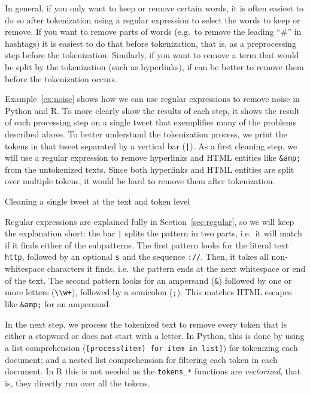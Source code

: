 In general, if you only want to keep or remove certain words, it is often easiest to do so after tokenization
using a regular expression to select the words to keep or remove.
If you want to remove parts of words (e.g.\ to remove the leading ``\#'' in hashtags) it is easiest to do that before tokenization,
that is, as a preprocessing step before the tokenization.
Similarly, if you want to remove a term that would be split by the tokenization (such as hyperlinks),
if can be better to remove them before the tokenization occurs.

Example~\ref{ex:noise} shows how we can use regular expressions to remove noise in Python and R.
To more clearly show the results of each step, it shows the result of each processing step on a single tweet that exemplifies many of the problems described above.
To better understand the tokenization process, we print the tokens in that tweet separated by a vertical bar (\verb+|+).
As a first cleaning step, we will use a regular expression to remove hyperlinks and HTML entities like \verb|&amp;| from the untokenized texts.
Since both hyperlinks and HTML entities are split over multiple tokens, it would be hard to remove them after tokenization.

\begin{ccsexample}
\caption{Cleaning a single tweet at the text and token level}\label{ex:noise}
\end{ccsexample}

Regular expressions are explained fully in Section~\ref{sec:regular}, so we will keep the explanation short:
the bar \verb#|# splits the pattern in two parts, i.e.\ it will match if it finds either of the subpatterns.
The first pattern looks for the literal text \verb#http#, followed by an optional \verb#s# and the sequence \verb#://#.
Then, it takes all non-whitespace characters it finds, i.e.\ the pattern ends at the next whitespace or end of the text.
The second pattern looks for an ampersand (\verb#&#) followed by one or more letters (\verb#\\w+#), followed by a semicolon (\verb#;#).
This matches HTML escapes like \verb#&amp;# for an ampersand.

In the next step, we process the tokenized text to remove every token that is either a stopword or does not start with a letter.
In Python, this is done by using a list comprehension (\verb#[process(item) for item in list]#) for tokenizing each document; and a nested list comprehension for filtering each token in each document.
In R this is not needed as the \texttt{tokens\_*} functions are \emph{vectorized}, that is, they directly run over all the tokens.

